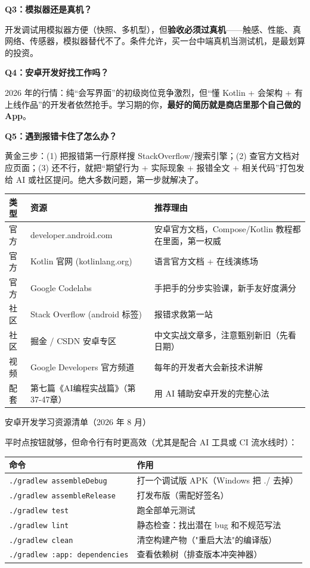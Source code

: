 \textbf{Q3：模拟器还是真机？}

开发调试用模拟器方便（快照、多机型），但\textbf{验收必须过真机}——触感、性能、真网络、传感器，模拟器替代不了。条件允许，买一台中端真机当测试机，是最划算的投资。

\textbf{Q4：安卓开发好找工作吗？}

2026 年的行情：纯“会写界面”的初级岗位竞争激烈，但“懂 Kotlin + 会架构 + 有上线作品”的开发者依然抢手。学习期的你，\textbf{最好的简历就是商店里那个自己做的 App}。

\textbf{Q5：遇到报错卡住了怎么办？}

黄金三步：(1) 把报错第一行原样搜 StackOverflow/搜索引擎；(2) 查官方文档对应页面；(3) 还不行，就把“期望行为 + 实际现象 + 报错全文 + 相关代码”打包发给 AI 或社区提问。绝大多数问题，第一步就解决了。


\begin{center}
\begin{tabularx}{\linewidth}{|X|X|X|}
\hline
\textbf{类型} & \textbf{资源} & \textbf{推荐理由} \tabularnewline
\hline
官方 & developer.android.com & 安卓官方文档，Compose/Kotlin 教程都在里面，第一权威 \tabularnewline
官方 & Kotlin 官网 (kotlinlang.org) & 语言官方文档 + 在线演练场 \tabularnewline
官方 & Google Codelabs & 手把手的分步实验课，新手友好度满分 \tabularnewline
社区 & Stack Overflow (android 标签) & 报错求救第一站 \tabularnewline
社区 & 掘金 / CSDN 安卓专区 & 中文实战文章多，注意甄别新旧（先看日期） \tabularnewline
视频 & Google Developers 官方频道 & 每年的开发者大会新技术讲解 \tabularnewline
配套 & 第七篇《AI编程实战篇》（第37-47章） & 用 AI 辅助安卓开发的完整心法 \tabularnewline
\hline
\end{tabularx}
\end{center}

\begin{center}\small\color{gray}安卓开发学习资源清单（2026 年 8 月）\end{center}


平时点按钮就够，但命令行有时更高效（尤其是配合 AI 工具或 CI 流水线时）：

\begin{center}
\begin{tabularx}{\linewidth}{|X|X|}
\hline
\textbf{命令} & \textbf{作用} \tabularnewline
\hline
\texttt{.\allowbreak /\allowbreak gradlew assembleDebug} & 打一个调试版 APK（Windows 把 ./ 去掉） \tabularnewline
\texttt{.\allowbreak /\allowbreak gradlew assembleRelease} & 打发布版（需配好签名） \tabularnewline
\texttt{.\allowbreak /\allowbreak gradlew test} & 跑全部单元测试 \tabularnewline
\texttt{.\allowbreak /\allowbreak gradlew lint} & 静态检查：找出潜在 bug 和不规范写法 \tabularnewline
\texttt{.\allowbreak /\allowbreak gradlew clean} & 清空构建产物（"重启大法"的编译版） \tabularnewline
\texttt{.\allowbreak /\allowbreak gradlew :app: dependencies} & 查看依赖树（排查版本冲突神器） \tabularnewline
\hline
\end{tabularx}
\end{center}

